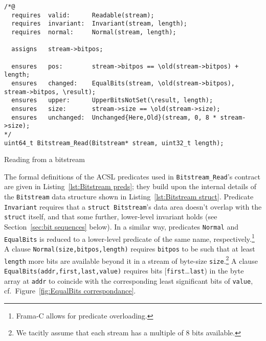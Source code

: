 \begin{listing}[hbt]
\begin{minipage}{0.99\textwidth}
\begin{lstlisting}[style=acsl-block]
/*@
  requires  valid:      Readable(stream);
  requires  invariant:  Invariant(stream, length);
  requires  normal:     Normal(stream, length);

  assigns   stream->bitpos;

  ensures   pos:        stream->bitpos == \old(stream->bitpos) + length;
  ensures   changed:    EqualBits(stream, \old(stream->bitpos), stream->bitpos, \result);
  ensures   upper:      UpperBitsNotSet(\result, length);
  ensures   size:       stream->size == \old(stream->size);
  ensures   unchanged:  Unchanged{Here,Old}(stream, 0, 8 * stream->size);
*/
uint64_t Bitstream_Read(Bitstream* stream, uint32_t length);
\end{lstlisting}
\end{minipage}
\caption{\label{lst:Bitstream_Read spec}Reading from a bitstream}
\end{listing}





The formal definitions of the ACSL predicates used
in \lstinline{Bitstream_Read}'s contract are given in
Listing~\ref{lst:Bitstream preds}; they build upon the internal
details of the \lstinline{Bitstream} data structure shown in
Listing~\ref{lst:Bitstream struct}.
%
Predicate \lstinline{Invariant} requires that a 
\lstinline{struct Bitstream}'s data area
doesn't overlap with the \lstinline{struct} itself, and that some
further, lower-level invariant holds (see Section~\ref{sec:bit sequences}
below).
%
In a similar way, predicates \lstinline{Normal} and
\lstinline{EqualBits} is reduced to a
lower-level predicate of the same 
name, respectively.\footnote{Frama-C allows for predicate overloading.}
%
A clause \lstinline{Normal(size,bitpos,length)} requires \lstinline{bitpos} to be such
that at least \lstinline{length} more bits are available beyond it in a stream of byte-size
\lstinline{size}.\footnote{
	We tacitly assume that each stream has a multiple of 8 bits available.
}
%
A clause \lstinline{EqualBits(addr,first,last,value)} requires 
bits [\lstinline{first}\ldots\lstinline{last}) in
the byte array at \lstinline{addr} to coincide with the corresponding
least significant bits of \lstinline{value}, 
cf.~Figure~\ref{fig:EqualBits correspondance}.


